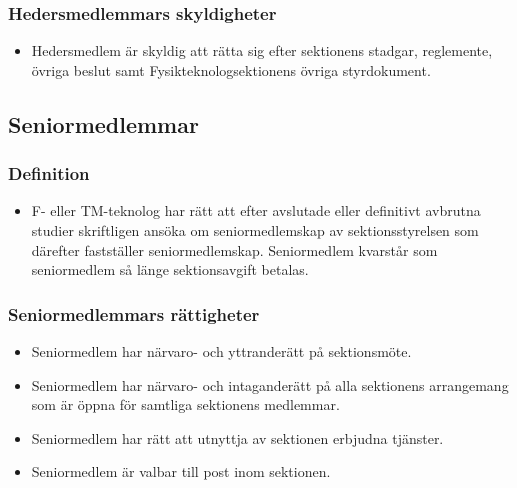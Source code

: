 \documentclass[11pt,a4paper]{article}
\begin{document}
\subsubsection{Hedersmedlemmars skyldigheter}
\begin{itemize}

  \item Hedersmedlem är skyldig att rätta sig efter sektionens stadgar,
  regle\-mente, övriga beslut samt  Fysikteknologsektionens övriga styrdokument.

\end{itemize}



\subsection{Seniormedlemmar}
\subsubsection{Definition}
\begin{itemize}

  \item F- eller TM-teknolog har rätt att efter avslutade eller definitivt
  avbrutna studier skriftligen ansöka om seniormedlemskap av sektionsstyrelsen
  som därefter fastställer seniormedlemskap. Seniormedlem kvarstår som
  senior\-med\-lem så länge sektionsavgift betalas.

\end{itemize}



\subsubsection{Seniormedlemmars rättigheter}
\begin{itemize}

  \item Seniormedlem har närvaro- och yttranderätt på sektionsmöte.

  \item Seniormedlem har närvaro- och intaganderätt på alla
   sektionens arrangemang som är öppna för samtliga sektionens
   medlemmar.

  \item Seniormedlem har rätt att utnyttja av sektionen erbjudna
   tjänster.
   
  \item Seniormedlem är valbar till post inom sektionen.

\end{itemize}
\end{document}

